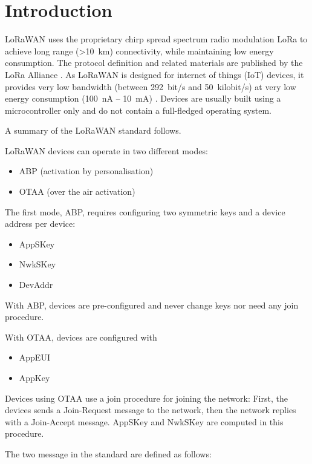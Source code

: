 \chapter{Introduction}

LoRaWAN uses the proprietary chirp spread spectrum radio modulation
LoRa to achieve long range (\textgreater{}10~km) connectivity, while
maintaining low energy consumption. The protocol definition and related materials are published by the LoRa Alliance \cite{spec}.
As LoRaWAN is designed for internet of things (IoT)
devices, it provides very low bandwidth (between 292~bit/s and 50~kilobit/s) at very low energy consumption (100~nA -- 10~mA) \cite{wiki_de_lorawan}. Devices are
usually built using a microcontroller only and do not contain a
full-fledged operating system.

A summary of the LoRaWAN standard \cite{spec} follows.

LoRaWAN devices can operate in two different modes:

\begin{itemize}
\tightlist
\item
  {ABP (activation by personalisation)}
\item
  {OTAA (over the air activation)}
\end{itemize}

{The first mode, ABP, requires configuring two symmetric keys and a
device address per device:}

\begin{itemize}
\tightlist
\item
  {AppSKey}
\item
  {NwkSKey}
\item
  {DevAddr}
\end{itemize}

{With ABP, devices are pre-configured and never change keys nor need any
join procedure.}


{With OTAA, devices are configured with}

\begin{itemize}
\tightlist
\item
  {AppEUI}
\item
  {AppKey}
\end{itemize}

{Devices using OTAA use a join procedure for joining the network: First,
the devices sends a Join-Request message to the network, then the network replies
with a Join-Accept message. AppSKey and NwkSKey are computed in this
procedure.}

{The two message in the standard are defined as follows:}

